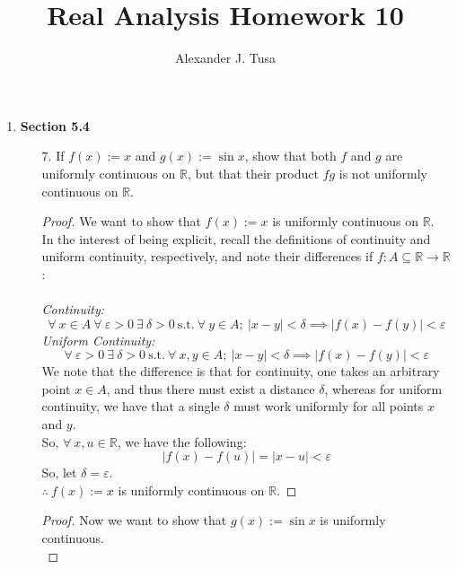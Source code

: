 \documentclass[12pt,letterpaper]{article}
\author{Alexander J. Tusa}
\title{Real Analysis Homework 10}
\newcommand{\st}{\ \text{s.t.}\ }
\newcommand{\R}{\mathbb{R}}
\theoremstyle{case}
\theoremstyle{definition}
\begin{document}
	\maketitle
	\begin{enumerate}
		\item \textbf{Section 5.4}
		\begin{enumerate}
			\item[7.] If $f(x):=x$ and $g(x):=\sin x$, show that both $f$ and $g$ are uniformly continuous on $\R$, but that their product $fg$ is not uniformly continuous on $\R$.
			
			\begin{proof}
				We want to show that $f(x):=x$ is uniformly continuous on $\R$.\\
				
				In the interest of being explicit, recall the definitions of continuity and uniform continuity, respectively, and note their differences if $f:A \subseteq \R \to \R$:\\\\
				\textit{Continuity:}
				\[\forall\ x \in A\ \forall\ \varepsilon>0\ \exists\ \delta > 0 \st \forall\ y \in A;\ |x-y|<\delta \implies |f(x)-f(y)|<\varepsilon\]
				\textit{Uniform Continuity:}
				\[\forall\ \varepsilon > 0\ \exists\ \delta >0 \st \forall\ x,y \in A;\  |x-y|<\delta \implies |f(x)-f(y)| < \varepsilon\]
				We note that the difference is that for continuity, one takes an arbitrary point $x \in A$, and thus there must exist a distance $\delta$, whereas for uniform continuity, we have that a single $\delta$ must work uniformly for all points $x$ and $y$.\\
				
				So, $\forall\ x,u \in \R$, we have the following:
				\[|f(x)-f(u)| = |x-u|<\varepsilon\]
				So, let $\delta = \varepsilon$.\\
				
				$\therefore\ f(x):=x$ is uniformly continuous on $\R$.
			\end{proof}
		
			\begin{proof}
				Now we want to show that $g(x):= \sin x$ is uniformly continuous.\\
				

\end{proof}
\end{enumerate}
\end{enumerate}
\end{document}
